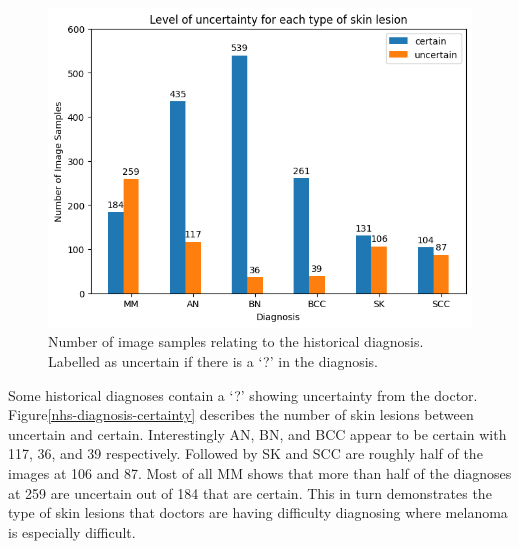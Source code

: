 \begin{figure}
    \centering
    \includegraphics[scale=0.75]{images/nhs/nhs-diagnosis-certainty.png}
    \caption{Number of image samples relating to the historical diagnosis. Labelled as uncertain if there is a `?' in the diagnosis.} 
\end{figure}\label{nhs-diagnosis-certainty}

Some historical diagnoses contain a `?' showing uncertainty from the doctor. Figure\ref{nhs-diagnosis-certainty} describes the number of skin lesions between uncertain and certain. Interestingly AN, BN, and BCC appear to be certain with 117, 36, and 39 respectively. Followed by SK and SCC are roughly half of the images at 106 and 87. Most of all MM shows that more than half of the diagnoses at 259 are uncertain out of 184 that are certain. This in turn demonstrates the type of skin lesions that doctors are having difficulty diagnosing where melanoma is especially difficult.

